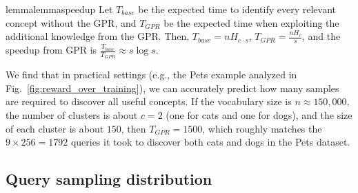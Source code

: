 \begin{restatable}{lemma}{lemmaspeedup}
    \label{lemma:speedup}
    Let $T_{base}$ be the expected time to identify every relevant concept without the GPR, and $T_{GPR}$ be the expected time when exploiting the additional knowledge from the GPR. Then, $T_{base} = n H_{c \cdot s}$, $T_{GPR} = \frac{nH_{c}}{s}$, and the speedup from GPR is $\frac{T_{base}}{T_{GPR}} \approx s \log s$.
\end{restatable}
\vspace*{1em}
We find that in practical settings (e.g., the Pets example analyzed in Fig.~\ref{fig:reward_over_training}), we can accurately predict how many samples are required to discover all useful concepts. If the vocabulary size is $n \approx 150{,}000$, the number of clusters is about $c = 2$ (one for cats and one for dogs), and the size of each cluster is about $150$, then $T_{GPR} = 1500$, which roughly matches the $9 \times 256 = 1792$ queries it took to discover both cats and dogs in the Pets dataset.

\subsection{Query sampling distribution}
\label{subsec:tiering}

